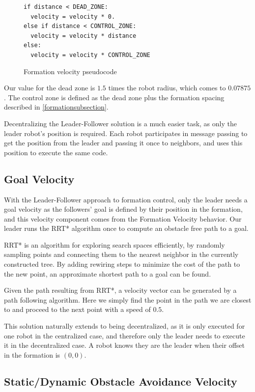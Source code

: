 \documentclass[letterpaper, 10 pt, conference]{ieeeconf}  %
\begin{document}
\begin{figure}[thpb]
\centering
\lstset{language=python}
\begin{lstlisting}
if distance < DEAD_ZONE:
  velocity = velocity * 0.
else if distance < CONTROL_ZONE:
  velocity = velocity * distance
else:
  velocity = velocity * CONTROL_ZONE
\end{lstlisting}
\caption{Formation velocity pseudocode}
\label{zonecode}
\end{figure}

Our value for the dead zone is $1.5$ times the robot radius, which comes to $0.07875$. The control zone is defined as the dead zone plus the formation spacing described in \ref{formationsubsection}.

Decentralizing the Leader-Follower solution is a much easier task, as only the leader robot's position is required. Each robot participates in message passing to get the position from the leader and passing it once to neighbors, and uses this position to execute the same code.

\subsection{Goal Velocity}

With the Leader-Follower approach to formation control, only the leader needs a goal velocity as the followers' goal is defined by their position in the formation, and this velocity component comes from the Formation Velocity behavior. Our leader runs the RRT* algorithm once to compute an obstacle free path to a goal.

RRT* is an algorithm for exploring search spaces efficiently, by randomly sampling points and connecting them to the nearest neighbor in the currently constructed tree. By adding rewiring steps to minimize the cost of the path to the new point, an approximate shortest path to a goal can be found.

Given the path resulting from RRT*, a velocity vector can be generated by a path following algorithm. Here we simply find the point in the path we are closest to and proceed to the next point with a speed of $0.5$.

This solution naturally extends to being decentralized, as it is only executed for one robot in the centralized case, and therefore only the leader needs to execute it in the decentralized case. A robot knows they are the leader when their offset in the formation is $(0,0)$.

\subsection{Static/Dynamic Obstacle Avoidance Velocity}
\end{document}
